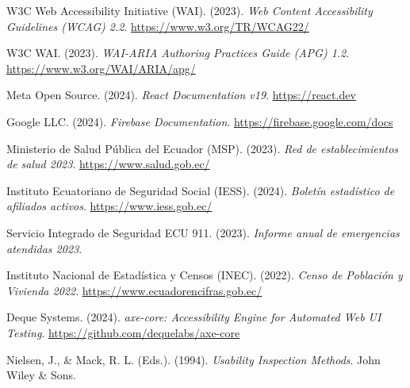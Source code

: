 \documentclass[12pt, a4paper]{article}
\begin{document}
\begin{enumerate}[label={[\arabic*]}]
  \item W3C Web Accessibility Initiative (WAI). (2023). \textit{Web Content Accessibility Guidelines (WCAG) 2.2}. \url{https://www.w3.org/TR/WCAG22/}

  \item W3C WAI. (2023). \textit{WAI-ARIA Authoring Practices Guide (APG) 1.2}. \url{https://www.w3.org/WAI/ARIA/apg/}

  \item Meta Open Source. (2024). \textit{React Documentation v19}. \url{https://react.dev}

  \item Google LLC. (2024). \textit{Firebase Documentation}. \url{https://firebase.google.com/docs}

  \item Ministerio de Salud Pública del Ecuador (MSP). (2023). \textit{Red de establecimientos de salud 2023}. \url{https://www.salud.gob.ec/}

  \item Instituto Ecuatoriano de Seguridad Social (IESS). (2024). \textit{Boletín estadístico de afiliados activos}. \url{https://www.iess.gob.ec/}

  \item Servicio Integrado de Seguridad ECU 911. (2023). \textit{Informe anual de emergencias atendidas 2023}.

  \item Instituto Nacional de Estadística y Censos (INEC). (2022). \textit{Censo de Población y Vivienda 2022}. \url{https://www.ecuadorencifras.gob.ec/}

  \item Deque Systems. (2024). \textit{axe-core: Accessibility Engine for Automated Web UI Testing}. \url{https://github.com/dequelabs/axe-core}

  \item Nielsen, J., \& Mack, R. L. (Eds.). (1994). \textit{Usability Inspection Methods}. John Wiley \& Sons.
\end{enumerate}
\end{document}
